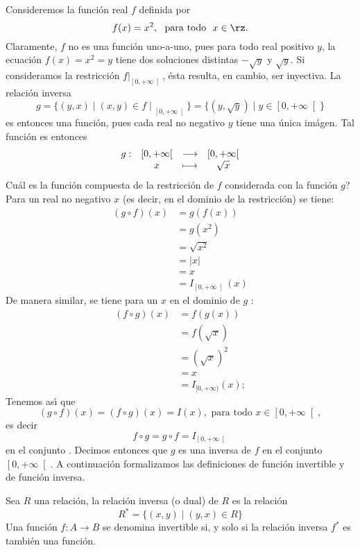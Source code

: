 \begin{example}
Consideremos la funci\'{o}n real $f$ definida por
\[
f(x)=x^{2},\mbox{ \ para todo \ }x\in\rz.
\]
Claramente, $f$ no es una funci\'{o}n uno-a-uno, pues para todo real positivo
$y$, la ecuaci\'{o}n $f(x)=x^{2}=y$ tiene dos soluciones distintas $-\sqrt{y}$
y $\sqrt{y}$. Si consideramos la restricci\'{o}n $f|_{\left[  0,+\infty
\right[  }$, \'{e}sta resulta, en cambio, ser inyectiva. La relaci\'{o}n
inversa
\[
g=\{(y,x)\mid(x,y)\in{f\mid}_{\left[  0,+\infty\right[  }\}=\{(y,\sqrt{y})\mid
y\in\left[  0,+\infty\right[  \}
\]
es entonces una funci\'{o}n, pues cada real no negativo $y$ tiene una
\'{u}nica im\'{a}gen. Tal funci\'{o}n es entonces
\[%
\begin{array}
[c]{cccc}%
g: & \left[  0,+\infty\right[  & \longrightarrow & \left[  0,+\infty\right[ \\
& x & \longmapsto & \sqrt{x}%
\end{array}
\]
\textquestiondown Cu\'{a}l es la funci\'{o}n compuesta de la restricci\'{o}n
de $f$ considerada con la funci\'{o}n $g$?\newline Para un real no negativo
$x$ (es decir, en el dominio de la restricci\'{o}n) se tiene:
\begin{align*}
(g\circ f)(x)  &  =g(f(x))\\
&  =g(x^{2})\\
&  =\sqrt{x^{2}}\\
&  =|x|\\
&  =x\\
&  ={I}_{\left[  0,+\infty\right[  }(x)
\end{align*}
De manera similar, se tiene para un $x$ en el dominio de $g$ :
\begin{align*}
(f\circ g)(x)  &  =f(g(x))\\
&  =f(\sqrt{x})\\
&  =\left(  \sqrt{x}\right)  ^{2}\\
&  =x\\
&  =I_{[0,+\infty)}(x);
\end{align*}
Tenemos as\'{\i} que
\[
(g\circ f)(x)=(f\circ g)(x)=I(x),\mbox{ \ para todo \ }x\in\left[
0,+\infty\right[  ,
\]
es decir
\[
f\circ g=g\circ f=I_{\left[  0,+\infty\right[  }%
\]
en el conjunto . Decimos entonces que $g$ es una inversa de $f$ en el conjunto
$\left[  0,+\infty\right[  $. A continuaci\'{o}n formalizamos las definiciones
de funci\'{o}n invertible y de funci\'{o}n inversa.
\end{example}

\begin{definition}
\label{relacioninversa} Sea $R$ una relaci\'{o}n, la
%
relaci\'{o}n inversa (o dual) de $R$ es la relaci\'{o}n
\begin{equation}
R^{\ast}=\{(x,y)\mid(y,x)\in R\} \label{ecrelacioninversa}%
\end{equation}
Una funci\'{o}n $f:A\longrightarrow B$ se denomina invertible%
si, y solo si la relaci\'{o}n inversa $f^{\ast}$ es tambi\'{e}n una funci\'{o}n.
\end{definition}

